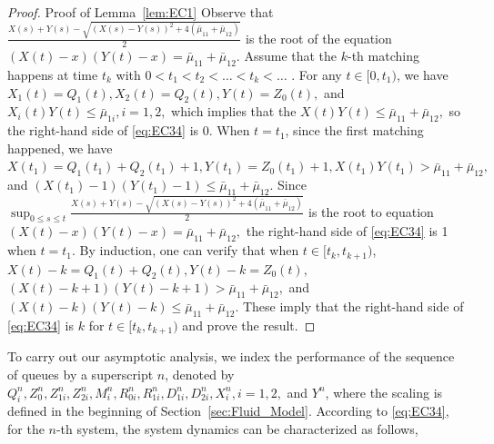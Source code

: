\begin{proof}{Proof of Lemma~\ref{lem:EC1}}
Observe that $\frac{X(s) + Y(s) - \sqrt{(X(s) - Y(s))^2 + 4(\bar{\mu}_{11}+\bar{\mu}_{12})}}{2}$ is the root of the equation $(X(t) - x)(Y(t) - x) = \bar{\mu}_{11} + \bar{\mu}_{12}$.
Assume that the $k$-th matching happens at 
time $t_k$ with $0 < t_1 < t_2 < \dots < t_k < \dots$ . For any $t \in [0, t_1)$, 
we have $X_1(t) = Q_1(t),X_2(t) = Q_2(t), Y(t) = Z_0(t),$ and $X_i(t)Y(t) \le \bar{\mu}_{1i}, i=1,2,$ which implies 
that the $X(t)Y(t) \le \bar{\mu}_{11}+\bar{\mu}_{12},$ so the right-hand side of \eqref{eq:EC34} is 0. When $t = t_1$, since the first 
matching happened, we have $X(t_1) = Q_1(t_1)+Q_2(t_1) + 1, Y(t_1) = Z_0(t_1) + 1, X(t_1)Y(t_1) > \bar{\mu}_{11}+\bar{\mu}_{12},$ 
and $(X(t_1) - 1)(Y(t_1) - 1) \le \bar{\mu}_{11}+\bar{\mu}_{12}.$
Since $\sup_{0 \le s \le t} \frac{X(s)+Y(s) - \sqrt{(X(s)-Y(s))^2+4(\bar{\mu}_{11}+\bar{\mu}_{12})}}{2}$ 
is the root to equation $(X(t) - x)(Y(t) - x) = \bar{\mu}_{11}+\bar{\mu}_{12},$ the right-hand side 
of \eqref{eq:EC34} is 1 when $t=t_1$. By induction, one can verify that 
when $t \in [t_k, t_{k+1})$, $X(t) - k = Q_1(t)+Q_2(t), Y(t) - k = Z_0(t),$ $(X(t) - k+1)(Y(t) - k+1) > \bar{\mu}_{11}+\bar{\mu}_{12},$ 
and $(X(t)-k)(Y(t)-k) \le \bar{\mu}_{11}+\bar{\mu}_{12}$. These imply that the right-hand side of 
\eqref{eq:EC34} is $k$ for $t \in [t_k, t_{k+1})$ and prove the result. 
\Halmos
\end{proof}

To carry out our asymptotic analysis, we index the performance of the sequence of queues by a superscript $n$, denoted by $Q_i^n, Z^n_0, Z^n_{1i}, Z^n_{2i}, M_i^n, R^n_{0i}, R^n_{1i}, D^n_{1i}, D^n_{2i}, X_i^n, i=1,2,$ and $Y^n$, where the scaling is defined in the beginning of Section~\ref{sec:Fluid_Model}.
According to \eqref{eq:EC34}, for the $n$-th system, the system dynamics can be characterized as follows,

